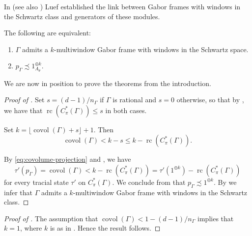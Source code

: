 \documentclass[reqno, a4paper]{amsart}
\numberwithin{equation}{section}
\DeclareMathOperator{\rc}{rc}
\DeclareMathOperator{\covol}{covol}
\begin{document}
In \cite{lu09,lu11} (see also \cite[Theorem A (iii)]{AuEn20}) Luef established the link between Gabor frames with windows in the Schwartz class and generators of these modules.

\begin{proposition}
\label{prop:gabor_frame_projection}
The following are equivalent:
\begin{enumerate}
\item 
$\Gamma$ admits a $k$-multiwindow Gabor frame with windows in the Schwartz space.
\item 
$p_\Gamma \precsim 1_{A_\theta}^{\oplus k}$.
\end{enumerate}
\end{proposition}

We are now in position to prove the theorems from the introduction.

\begin{proof}[Proof of ]
Set $s = (d-1)/n_\Gamma$ if $\Gamma$ is rational and $s = 0$ otherwise, so that by , we have that $\rc(C_\pi^*(\Gamma)) \leq s$ in both cases.

Set $k = \lfloor \covol(\Gamma) + s \rfloor + 1$.
Then
\[
\covol(\Gamma) 
< k-s
\leq k - \rc(C_\pi^*(\Gamma)).
\]

By \eqref{eq:covolume-projection} and , we have
\[
\tau'(p_\Gamma) = \covol(\Gamma)
< k - \rc(C_\pi^*(\Gamma))
= \tau'(1^{\oplus k}) - \rc(C_\pi^*(\Gamma))
\]
for every tracial state $\tau'$ on $C_\pi^*(\Gamma)$. 
We conclude from  that $p_\Gamma \precsim 1^{\oplus k}$. 
By  we infer that $\Gamma$ admits a $k$-multiwindow Gabor frame with windows in the Schwartz class.
\end{proof}

\begin{proof}[Proof of ]
The assumption that $\covol(\Gamma) < 1 - (d-1)/n_\Gamma$ implies that $k = 1$, where $k$ is as in . Hence the result follows.
\end{proof}


\end{document}
